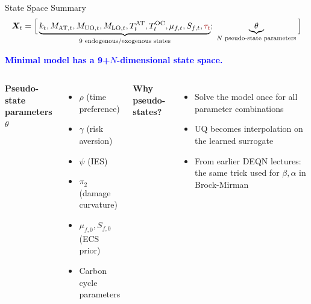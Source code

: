 \documentclass[aspectratio=169,11pt]{beamer}
\newcommand{\emphc}[1]{\textcolor{harvardcrimson}{#1}}
\newcommand{\X}{\bm{X}}
\begin{document}
\begin{frame}{State Space Summary}
\[
\X_t = \Big[\underbrace{k_t, M_{\mathrm{AT},t}, M_{\mathrm{UO},t}, M_{\mathrm{LO},t}, T^{\mathrm{AT}}_t, T^{\mathrm{OC}}_t, \mu_{f,t}, S_{f,t}, \emphc{\tau_t}}_{\text{9 endogenous/exogenous states}};\; \underbrace{\theta}_{\text{$N$ pseudo-state parameters}}\Big]
\]

\vspace{0.2cm}
\begin{center}
\textcolor{blue}{\textbf{Minimal model has a 9+$N$-dimensional state space.}}
\end{center}

\vspace{0.2cm}
\begin{columns}[T]
\textbf{Pseudo-state parameters $\theta$}
\begin{itemize}
    \item $\rho$ (time preference)
    \item $\gamma$ (risk aversion)
    \item $\psi$ (IES)
    \item $\pi_2$ (damage curvature)
    \item $\mu_{f,0}, S_{f,0}$ (ECS prior)
    \item Carbon cycle parameters
\end{itemize}

\textbf{Why pseudo-states?}
\begin{itemize}
    \item Solve the model \emphc{once} for all parameter combinations
    \item UQ becomes interpolation on the learned surrogate
    \item From earlier DEQN lectures: the same trick used for $\beta, \alpha$ in Brock-Mirman
\end{itemize}
\end{columns}
\end{frame}
\end{document}
